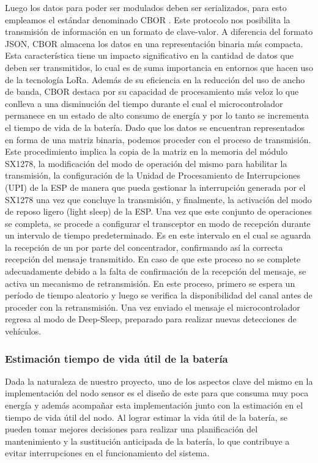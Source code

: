 Luego los datos para poder ser modulados deben ser serializados, para esto empleamos el estándar denominado CBOR \cite{cbor}. Este protocolo nos posibilita la transmisión de información en un formato de clave-valor. A diferencia del formato JSON, CBOR almacena los datos en una representación binaria más compacta. Esta característica tiene un impacto significativo en la cantidad de datos que deben ser transmitidos, lo cual es de suma importancia en entornos que hacen uso de la tecnología LoRa. Además de su eficiencia en la reducción del uso de ancho de banda, CBOR destaca por su capacidad de procesamiento más veloz lo que conlleva a una disminución del tiempo durante el cual el microcontrolador permanece en un estado de alto consumo de energía y por lo tanto se incrementa el tiempo de vida de la batería.
Dado que los datos se encuentran representados en forma de una matriz binaria, podemos proceder con el proceso de transmisión. Este procedimiento implica la copia de la matriz en la memoria del módulo SX1278, la modificación del modo de operación del mismo para habilitar la transmisión, la configuración de la Unidad de Procesamiento de Interrupciones (UPI) de la ESP de manera que pueda gestionar la interrupción generada por el SX1278 una vez que concluye la transmisión, y finalmente, la activación del modo de reposo ligero (light sleep) de la ESP. Una vez que este conjunto de operaciones se completa, se procede a configurar el transceptor en modo de recepción durante un intervalo de tiempo predeterminado. Es en este intervalo en el cual se aguarda la recepción de un  por parte del concentrador, confirmando así la correcta recepción del mensaje transmitido.
En caso de que este proceso no se complete adecuadamente debido a la falta de confirmación de la recepción del mensaje, se activa un mecanismo de retransmisión. En este proceso, primero se espera un período de tiempo aleatorio y luego se verifica la disponibilidad del canal antes de proceder con la retransmisión.
Una vez enviado el mensaje el microcontrolador regresa al modo de Deep-Sleep, preparado para realizar nuevas detecciones de vehículos.




\subsubsection{Estimación tiempo de vida útil de la batería}{\label{sec:bateria_del_nodo_sensor}}
Dada la naturaleza de nuestro proyecto, uno de los aspectos clave del mismo en la
implementación del nodo sensor es el diseño de este para que consuma muy poca energía y
además acompañar esta implementación junto con la estimación en el tiempo de vida útil
del nodo.
Al lograr estimar la vida útil de la batería, se pueden tomar mejores decisiones para
realizar una planificación del mantenimiento y la sustitución anticipada de la batería,
lo que contribuye a evitar interrupciones en el funcionamiento del sistema.

